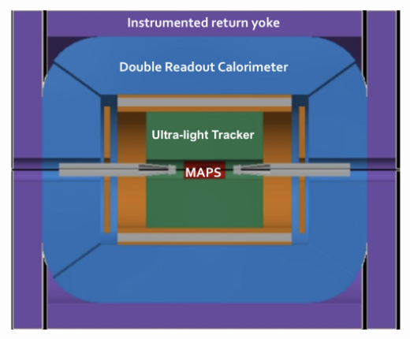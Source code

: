 \documentclass[aspectratio=169, hyperref={colorlinks=true,pdfpagelabels=false,linkcolor=black}, xcolor=dvipsnames,10pt]{beamer}
\begin{document}
\begin{frame}
\begin{columns}
        \vspace{-1cm}
	\centering
	\includegraphics[width=\textwidth]{../figures/FCCeeIDEAConcept.png}
	\end{columns}

\end{frame}
\end{document}
